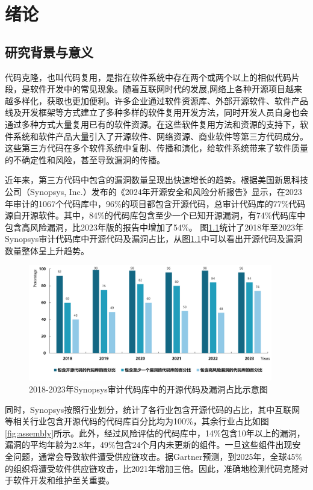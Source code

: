 \chapter{绪论}
\label{chap:intro}

\section{研究背景与意义}
\label{sec:background}
代码克隆，也叫代码复用，是指在软件系统中存在两个或两个以上的相似代码片段\cite{乐乔艺2021代码克隆检测研究进展综述}，是软件开发中的常见现象。随着互联网时代的发展,网络上各种开源项目越来越多样化，获取也更加便利。许多企业通过软件资源库、外部开源软件、软件产品线及开发框架等方式建立了多种多样的软件复用开发方法，同时开发人员自身也会通过多种方式大量复用已有的软件资源。在这些软件复用方法和资源的支持下，软件系统和软件产品大量引入了开源软件、网络资源、商业软件等第三方代码成分。这些第三方代码在多个软件系统中复制、传播和演化，给软件系统带来了软件质量的不确定性和风险，甚至导致漏洞的传播\cite{JSJY20230911009}。

近年来，第三方代码中包含的漏洞数量呈现出快速增长的趋势。根据美国新思科技公司（Synopsys, Inc.）发布的《2024年开源安全和风险分析报告》\cite{Synopsys_2024}显示，在2023年审计的1067个代码库中，96\%的项目都包含开源代码，总审计代码库的77\%代码源自开源软件。其中，84\%的代码库包含至少一个已知开源漏洞，有74\%代码库中包含高风险漏洞，比2023年版的报告中增加了54\%。
图\ref{fig:Proportion}统计了2018年至2023年Synopsys审计代码库中开源代码及漏洞占比，从图\ref{fig:Proportion}中可以看出开源代码及漏洞数量整体呈上升趋势。

\begin{figure}[H]
    \centering
    \includegraphics[width=0.95\textwidth]{figures/Proportion}
    \caption{2018-2023年Synopsys审计代码库中的开源代码及漏洞占比示意图}\label{fig:Proportion}
\end{figure}

同时，Synopsys按照行业划分，统计了各行业包含开源代码的占比，其中互联网等相关行业包含开源代码的代码库百分比均为100\%，其余行业占比如图\ref{fig:assembly}所示。此外，经过风险评估的代码库中，14\%包含10年以上的漏洞，漏洞的平均年龄为2.8年，49\%包含24个月内未更新的组件。一旦这些组件出现安全问题，通常会导致软件遭受供应链攻击。据Gartner\cite{Gartner_2022}预测，到2025年，全球45\%的组织将遭受软件供应链攻击，比2021年增加三倍。因此，准确地检测代码克隆对于软件开发和维护至关重要。

